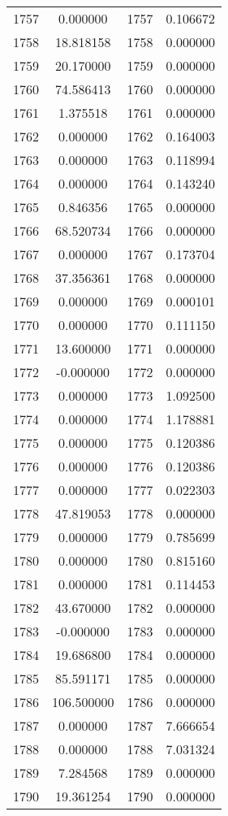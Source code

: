 \documentclass[12pt]{article}
\begin{document}
\begin{longtable}{@{}cccc@{}}
1757 & 0.000000 & 1757 & 0.106672 \\
1758 & 18.818158 & 1758 & 0.000000 \\
1759 & 20.170000 & 1759 & 0.000000 \\
1760 & 74.586413 & 1760 & 0.000000 \\
1761 & 1.375518 & 1761 & 0.000000 \\
1762 & 0.000000 & 1762 & 0.164003 \\
1763 & 0.000000 & 1763 & 0.118994 \\
1764 & 0.000000 & 1764 & 0.143240 \\
1765 & 0.846356 & 1765 & 0.000000 \\
1766 & 68.520734 & 1766 & 0.000000 \\
1767 & 0.000000 & 1767 & 0.173704 \\
1768 & 37.356361 & 1768 & 0.000000 \\
1769 & 0.000000 & 1769 & 0.000101 \\
1770 & 0.000000 & 1770 & 0.111150 \\
1771 & 13.600000 & 1771 & 0.000000 \\
1772 & -0.000000 & 1772 & 0.000000 \\
1773 & 0.000000 & 1773 & 1.092500 \\
1774 & 0.000000 & 1774 & 1.178881 \\
1775 & 0.000000 & 1775 & 0.120386 \\
1776 & 0.000000 & 1776 & 0.120386 \\
1777 & 0.000000 & 1777 & 0.022303 \\
1778 & 47.819053 & 1778 & 0.000000 \\
1779 & 0.000000 & 1779 & 0.785699 \\
1780 & 0.000000 & 1780 & 0.815160 \\
1781 & 0.000000 & 1781 & 0.114453 \\
1782 & 43.670000 & 1782 & 0.000000 \\
1783 & -0.000000 & 1783 & 0.000000 \\
1784 & 19.686800 & 1784 & 0.000000 \\
1785 & 85.591171 & 1785 & 0.000000 \\
1786 & 106.500000 & 1786 & 0.000000 \\
1787 & 0.000000 & 1787 & 7.666654 \\
1788 & 0.000000 & 1788 & 7.031324 \\
1789 & 7.284568 & 1789 & 0.000000 \\
1790 & 19.361254 & 1790 & 0.000000 \\

\end{longtable}
\end{document}
